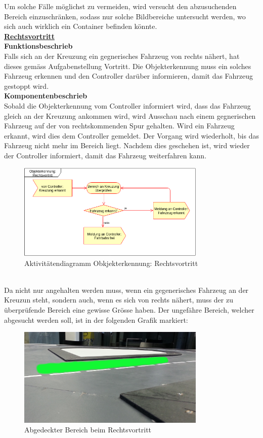 Um solche Fälle möglichst zu vermeiden, wird versucht den abzusuchenden Bereich einzuschränken, sodass nur solche Bildbereiche untersucht werden, wo sich auch wirklich ein Container befinden könnte. 
\\[0.2cm]
\underline{\textbf{Rechtsvortritt}}
\\[0.2cm]
\textbf{Funktionsbeschrieb}\\[0.2cm]
Falls sich an der Kreuzung ein gegnerisches Fahrzeug von rechts nähert, hat dieses gemäss Aufgabenstellung Vortritt. Die Objekterkennung muss ein solches Fahrzeug erkennen und den Controller darüber informieren, damit das Fahrzeug gestoppt wird.
\\[0.2cm]
\textbf{Komponentenbeschrieb}\\[0.2cm]
Sobald die Objekterkennung vom Controller informiert wird, dass das Fahrzeug gleich an der Kreuzung ankommen wird, wird Ausschau nach einem gegnerischen Fahrzeug auf der von rechtskommenden Spur gehalten. Wird ein Fahrzeug erkannt, wird dies dem Controller gemeldet. Der Vorgang wird wiederholt, bis das Fahrzeug nicht mehr im Bereich liegt. Nachdem dies geschehen ist, wird wieder der Controller informiert, damit das Fahrzeug weiterfahren kann.
\begin{figure}[H]%
\centering
\includegraphics[width=0.8\textwidth]{03_Loesungskonzept/pictures/objekterkennung_rechtsvortritt.png}
\caption{Aktivitätendiagramm Obkjekterkennung: Rechtsvortritt}
\label{fig:activityRechtsvortritt}
\end{figure} \\
\newpage
Da nicht nur angehalten werden muss, wenn ein gegenerisches Fahrzeug an der Kreuzun steht, sondern auch, wenn es sich von rechts nähert, muss der zu überprüfende Bereich eine gewisse Grösse haben. Der ungefähre Bereich, welcher abgesucht werden soll, ist in der folgenden Grafik markiert:
\begin{figure}[H]%
\centering
\includegraphics[width=0.8\textwidth]{03_Loesungskonzept/pictures/rechtsvortritt_bereich.jpg}
\caption{Abgedeckter Bereich beim Rechtsvortritt}
\label{fig:bereichRechtsvortritt}
\end{figure}
